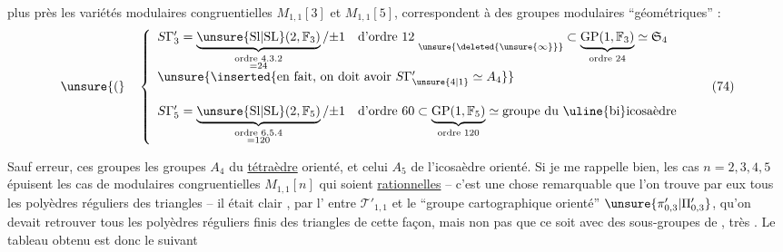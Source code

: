 
plus près les variétés modulaires congruentielles
$M_{1,1}[3]$ et $M_{1,1}[5]$, correspondent à des
groupes modulaires ``géométriques'' :
\[
\unsure{(}\quad
\left\{
\begin{array}{l}
S\Gamma'_3 = \underbrace{\unsure{\mathrm{Sl}|\mathrm{SL}}(2,\mathbb F_3)}_{\substack{\text{ordre }4.3.2\\=24}}/\mathord{\pm}1
\quad \text{d'ordre }12\;\underset{\unsure{\deleted{\unsure{\infty}}}}{\phantom{a}}
\subset \underbrace{\mathrm{GP}(1,\mathbb F_3)}_{\text{ordre }24}\simeq\mathfrak S_4
\\[1.5em]
\unsure{\inserted{\text{en fait, on doit avoir } S\Gamma'_{\unsure{4|1}}\simeq A_4}}
\\[1.5em]
S\Gamma'_5 = \underbrace{\unsure{\mathrm{Sl}|\mathrm{SL}}(2,\mathbb F_5)}_{\substack{\text{ordre }6.5.4\\=120}}/\mathord{\pm}1
\quad \text{d'ordre }60
\subset \underbrace{\mathrm{GP}(1,\mathbb F_5)}_{\text{ordre }120}\simeq\text{groupe du \uline{bi}icosaèdre}
\end{array}
\right.
\tag{74}
\]

Sauf erreur, ces groupes   les groupes $A_4$ du
\uline{tétraèdre} orienté, et celui $A_5$ de l'icosaèdre
orienté. Si je me rappelle bien, les cas
$n=2,3,4,5$ épuisent les cas de  modulaires
congruentielles $M_{1,1}[n]$ qui soient \uline{rationnelles}
-- c'est une chose remarquable que l'on trouve
par eux tous les polyèdres réguliers   des
triangles  -- il était clair , par l' entre
$\mathcal T'_{1,1}$ et le ``groupe cartographique  orienté'' $\unsure{\pi'_{0,3}|\Pi'_{0,3}}$,
qu'on devait retrouver tous
les polyèdres réguliers finis  des
triangles de cette façon, mais non pas que
ce soit avec des sous-groupes de ,
très . Le tableau obtenu est
donc le suivant


